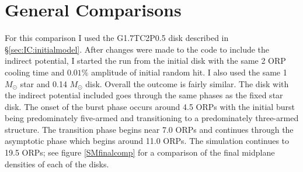 \section{General Comparisons} \label{SMoverview}

For this comparison I used the G1.7TC2P0.5 disk described in \S\ref{sec:IC:initialmodel}. After changes were made to the code to include the indirect potential, I started the run from the initial disk with the same 2 ORP cooling time and $0.01\%$ amplitude of initial random hit. I also used the same 1 $M_\odot$ star and 0.14 $M_\odot$ disk. Overall the outcome is fairly similar. The disk with the indirect potential included goes through the same phases as the fixed star disk.  The onset of the burst phase occurs around 4.5 ORPs with the initial burst being predominately five-armed and transitioning to a predominately three-armed structure. The transition phase begins near 7.0 ORPs and continues through the asymptotic phase which begins around 11.0 ORPs. The simulation continues to 19.5 ORPs; see figure \ref{SMfinalcomp} for a comparison of the final midplane densities of each of the disks. 

